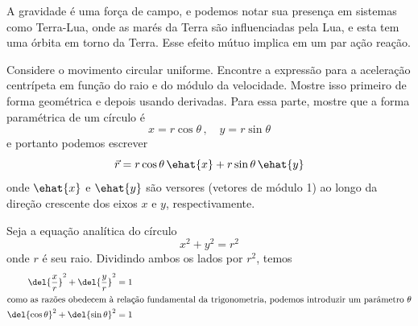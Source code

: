 \documentclass[]{IMTexam}
\begin{document}
\begin{questions}
\begin{parts}
		\begin{solution}
			A gravidade é uma força de campo, e podemos notar sua presença em sistemas como Terra-Lua, onde as marés da Terra são influenciadas pela Lua, e esta tem uma órbita em torno da Terra. Esse efeito mútuo implica em um par ação reação.
		\end{solution}
	\end{parts}

	\question \label{ques:q5}
	Considere o movimento circular uniforme. Encontre a expressão para a aceleração centrípeta em função do raio e do módulo da velocidade. Mostre isso primeiro de forma geométrica e depois usando derivadas. Para essa parte, mostre que a forma paramétrica de um círculo é
	\[ x=r\cos\theta\, ,\quad y=r\sin\theta \]
	e portanto podemos escrever
	\[ \vec{r}=r\cos\theta\, \ehat{x}+r\sin\theta\, \ehat{y} \]
	onde $\ehat{x}$ e $\ehat{y}$ são versores (vetores de módulo 1) ao longo da direção crescente dos eixos $ x $ e $ y $, respectivamente.

	\begin{solution}

		\begin{multi}
			Seja a equação analítica do círculo
			\begin{equation}\label{eq:circAna}
				x^{2}+y^{2}=r^{2}
			\end{equation}
			onde $ r $ é seu raio. Dividindo ambos os lados por $ r^{2} $, temos
			\begin{align*}
				\del{\dfrac{x}{r}}^{2}+\del{\dfrac{y}{r}}^{2} & =1 \\
				\intertext{como as razões obedecem à relação fundamental da trigonometria, podemos introduzir um parâmetro $ \theta $}
				\del{\cos\theta}^{2}+\del{\sin\theta}^{2}     & =1
			\end{align*}

			\nextcol

			\centering
			\setmyunit{2cm}
\end{multi}
\end{solution}
\end{questions}
\end{document}
